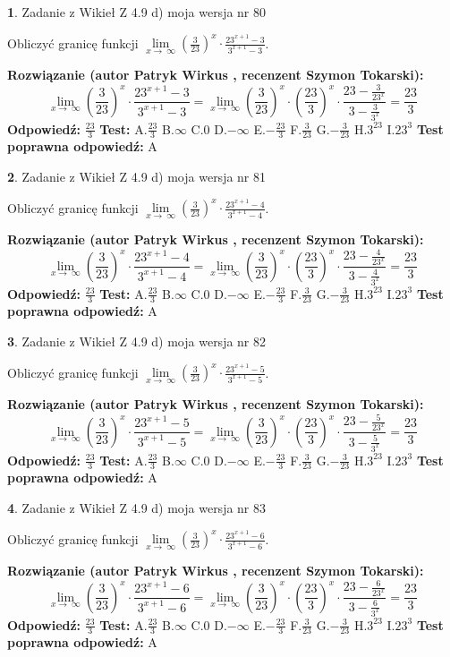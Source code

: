 \documentclass[12pt, a4paper]{article}
\theoremstyle{definition} %
\newtheorem{zad}{}
\newcommand{\zadStart}[1]{\begin{zad}#1\newline}
\newcommand{\zadStop}{\end{zad}}
\newcommand{\rozwStart}[2]{\noindent \textbf{Rozwiązanie (autor #1 , recenzent #2): }\newline}
\newcommand{\rozwStop}{\newline}
\newcommand{\odpStart}{\noindent \textbf{Odpowiedź:}\newline}
\newcommand{\odpStop}{\newline}
\newcommand{\testStart}{\noindent \textbf{Test:}\newline}
\newcommand{\testStop}{\newline}
\newcommand{\kluczStart}{\noindent \textbf{Test poprawna odpowiedź:}\newline}
\newcommand{\kluczStop}{\newline}
\begin{document}
\zadStart{Zadanie z Wikieł Z 4.9 d) moja wersja nr 80}


Obliczyć granicę funkcji  $\lim\limits_{x\to\ \infty}(\frac{3}{23})^{x}\cdot\frac{23^{x+1}-3}{3^{x+1}-3}$.
\zadStop
\rozwStart{Patryk Wirkus}{Szymon Tokarski}
$$\lim\limits_{x\to\ \infty}(\frac{3}{23})^{x}\cdot\frac{23^{x+1}-3}{3^{x+1}-3}=\lim\limits_{x\to\ \infty}(\frac{3}{23})^{x}\cdot(\frac{23}{3})^{x} \cdot \frac{23-\frac{3}{23^{x}}}{3-\frac{3}{3^{x}}} = \frac{23}{3}$$
\rozwStop
\odpStart
$\frac{23}{3}$
\odpStop
\testStart
A.$\frac{23}{3}$ B.$\infty$ C.$0$ D.$-\infty$ E.$-\frac{23}{3}$
F.$\frac{3}{23}$ G.$-\frac{3}{23}$
H.$3^{23}$
I.$23^{3}$
\testStop
\kluczStart
A
\kluczStop



\zadStart{Zadanie z Wikieł Z 4.9 d) moja wersja nr 81}


Obliczyć granicę funkcji  $\lim\limits_{x\to\ \infty}(\frac{3}{23})^{x}\cdot\frac{23^{x+1}-4}{3^{x+1}-4}$.
\zadStop
\rozwStart{Patryk Wirkus}{Szymon Tokarski}
$$\lim\limits_{x\to\ \infty}(\frac{3}{23})^{x}\cdot\frac{23^{x+1}-4}{3^{x+1}-4}=\lim\limits_{x\to\ \infty}(\frac{3}{23})^{x}\cdot(\frac{23}{3})^{x} \cdot \frac{23-\frac{4}{23^{x}}}{3-\frac{4}{3^{x}}} = \frac{23}{3}$$
\rozwStop
\odpStart
$\frac{23}{3}$
\odpStop
\testStart
A.$\frac{23}{3}$ B.$\infty$ C.$0$ D.$-\infty$ E.$-\frac{23}{3}$
F.$\frac{3}{23}$ G.$-\frac{3}{23}$
H.$3^{23}$
I.$23^{3}$
\testStop
\kluczStart
A
\kluczStop



\zadStart{Zadanie z Wikieł Z 4.9 d) moja wersja nr 82}


Obliczyć granicę funkcji  $\lim\limits_{x\to\ \infty}(\frac{3}{23})^{x}\cdot\frac{23^{x+1}-5}{3^{x+1}-5}$.
\zadStop
\rozwStart{Patryk Wirkus}{Szymon Tokarski}
$$\lim\limits_{x\to\ \infty}(\frac{3}{23})^{x}\cdot\frac{23^{x+1}-5}{3^{x+1}-5}=\lim\limits_{x\to\ \infty}(\frac{3}{23})^{x}\cdot(\frac{23}{3})^{x} \cdot \frac{23-\frac{5}{23^{x}}}{3-\frac{5}{3^{x}}} = \frac{23}{3}$$
\rozwStop
\odpStart
$\frac{23}{3}$
\odpStop
\testStart
A.$\frac{23}{3}$ B.$\infty$ C.$0$ D.$-\infty$ E.$-\frac{23}{3}$
F.$\frac{3}{23}$ G.$-\frac{3}{23}$
H.$3^{23}$
I.$23^{3}$
\testStop
\kluczStart
A
\kluczStop



\zadStart{Zadanie z Wikieł Z 4.9 d) moja wersja nr 83}


Obliczyć granicę funkcji  $\lim\limits_{x\to\ \infty}(\frac{3}{23})^{x}\cdot\frac{23^{x+1}-6}{3^{x+1}-6}$.
\zadStop
\rozwStart{Patryk Wirkus}{Szymon Tokarski}
$$\lim\limits_{x\to\ \infty}(\frac{3}{23})^{x}\cdot\frac{23^{x+1}-6}{3^{x+1}-6}=\lim\limits_{x\to\ \infty}(\frac{3}{23})^{x}\cdot(\frac{23}{3})^{x} \cdot \frac{23-\frac{6}{23^{x}}}{3-\frac{6}{3^{x}}} = \frac{23}{3}$$
\rozwStop
\odpStart
$\frac{23}{3}$
\odpStop
\testStart
A.$\frac{23}{3}$ B.$\infty$ C.$0$ D.$-\infty$ E.$-\frac{23}{3}$
F.$\frac{3}{23}$ G.$-\frac{3}{23}$
H.$3^{23}$
I.$23^{3}$
\testStop
\kluczStart
A
\kluczStop
\end{document}
